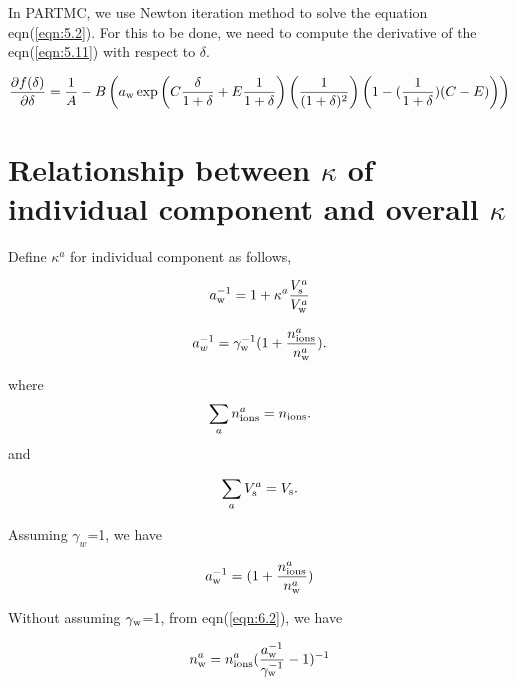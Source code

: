 \documentclass[12pt]{article}
\begin{document}
In PARTMC, we use Newton iteration method to solve the equation eqn(\ref{eqn:5.2}). For this to be done, we need to compute the derivative of the eqn(\ref{eqn:5.11}) with respect to $\delta$.

\begin{equation}\label{eqn:5.12}
\frac{\partial{f( \delta)} } {\partial{\delta}} =
\frac{1}{A} -B \left(a_{\rm w}\exp{\left(C \frac{\delta}{1+\delta} +E \frac{1}{1+\delta}\right)}   
\left(\frac{1}{(1+\delta)^{2}}\right)
\left(1-(\frac{1}{1+\delta})(C-E) \right)
\right)
\end{equation}

\section{Relationship between $\kappa$ of individual component and overall $\kappa$}

Define $\kappa^{a}$ for individual component as follows, 

\begin{equation}\label{eqn:6.1}
a_{\rm w}^{-1}=1+\kappa^{a} \frac{V_{\rm s}^{a}}{V_{\rm w}^{a}} 
\end{equation}

\begin{equation}\label{eqn:6.2}
a_{w}^{-1}=\gamma_{\rm w}^{-1} (1+\frac{n_{\rm ions}^{a}}{n_{\rm w}^{a}}).
\end{equation}

where
\begin{equation}\label{eqn:6.3}
\sum_{a} n_{\rm ions}^{a}=n_{\rm ions}.
\end{equation}
 and 
 
\begin{equation}\label{eqn:6.4}
\sum_{a} V_{\rm s}^{a}=V_{\rm s}.
\end{equation}

Assuming $\gamma_{w}$=1, we have 

\begin{equation}\label{eqn:6.5}
a_{\rm w}^{-1}=(1+\frac{n_{\rm ions}^{a}}{n_{\rm w}^{a}})
\end{equation}

Without assuming $\gamma_{\rm w}$=1, from eqn(\ref{eqn:6.2}), we have

\begin{equation}\label{eqn:6.6}
n_{\rm w}^{a}=n_{\rm ions}^{a}(\frac{a_{\rm w}^{-1}}{\gamma_{\rm w}^{-1}}-1)^{-1}
\end{equation}
\end{document}
